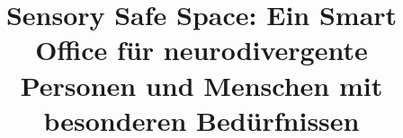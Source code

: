 \title{Sensory Safe Space: Ein Smart Office für neurodivergente Personen und
Menschen mit besonderen Bedürfnissen}
